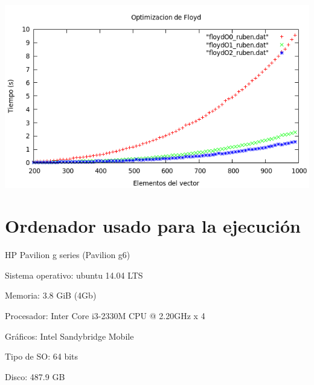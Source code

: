 \documentclass[11pt,spanish]{article} %
\begin{document}
\begin{center}
\includegraphics[scale=0.55]{../Graficas/Floyd/floyd_optimizacion.png}
\end{center}


\section{Ordenador usado para la ejecuci\'on}
HP Pavilion g series (Pavilion g6)

Sistema operativo: ubuntu 14.04 LTS

Memoria: 3.8 GiB (4Gb)

Procesador: Inter Core i3-2330M CPU @ 2.20GHz x 4

Gráficos: Intel Sandybridge Mobile

Tipo de SO: 64 bits

Disco: 487.9 GB

\newpage

\end{document}
